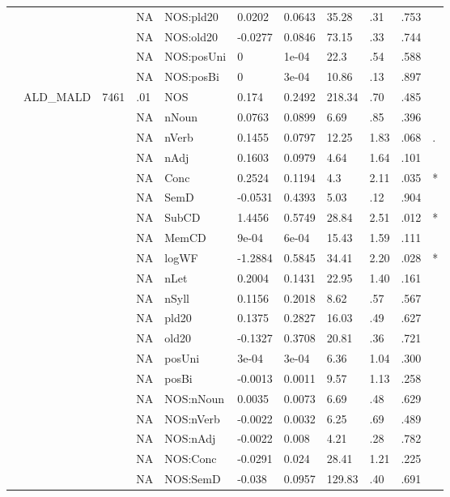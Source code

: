 \begin{table}[ht]
\begin{tabular}{lllllllllll}
   &  &  & NA & NOS:pld20 & 0.0202 & 0.0643 & 35.28 & .31 & .753 &   \\ 
   &  &  & NA & NOS:old20 & -0.0277 & 0.0846 & 73.15 & .33 & .744 &   \\ 
   &  &  & NA & NOS:posUni & 0 & 1e-04 & 22.3 & .54 & .588 &   \\ 
   &  &  & NA & NOS:posBi & 0 & 3e-04 & 10.86 & .13 & .897 &   \\ 
   & ALD\_MALD & 7461 & .01 & NOS & 0.174 & 0.2492 & 218.34 & .70 & .485 &   \\ 
   &  &  & NA & nNoun & 0.0763 & 0.0899 & 6.69 & .85 & .396 &   \\ 
   &  &  & NA & nVerb & 0.1455 & 0.0797 & 12.25 & 1.83 & .068 & . \\ 
   &  &  & NA & nAdj & 0.1603 & 0.0979 & 4.64 & 1.64 & .101 &   \\ 
   &  &  & NA & Conc & 0.2524 & 0.1194 & 4.3 & 2.11 & .035 & * \\ 
   &  &  & NA & SemD & -0.0531 & 0.4393 & 5.03 & .12 & .904 &   \\ 
   &  &  & NA & SubCD & 1.4456 & 0.5749 & 28.84 & 2.51 & .012 & * \\ 
   &  &  & NA & MemCD & 9e-04 & 6e-04 & 15.43 & 1.59 & .111 &   \\ 
   &  &  & NA & logWF & -1.2884 & 0.5845 & 34.41 & 2.20 & .028 & * \\ 
   &  &  & NA & nLet & 0.2004 & 0.1431 & 22.95 & 1.40 & .161 &   \\ 
   &  &  & NA & nSyll & 0.1156 & 0.2018 & 8.62 & .57 & .567 &   \\ 
   &  &  & NA & pld20 & 0.1375 & 0.2827 & 16.03 & .49 & .627 &   \\ 
   &  &  & NA & old20 & -0.1327 & 0.3708 & 20.81 & .36 & .721 &   \\ 
   &  &  & NA & posUni & 3e-04 & 3e-04 & 6.36 & 1.04 & .300 &   \\ 
   &  &  & NA & posBi & -0.0013 & 0.0011 & 9.57 & 1.13 & .258 &   \\ 
   &  &  & NA & NOS:nNoun & 0.0035 & 0.0073 & 6.69 & .48 & .629 &   \\ 
   &  &  & NA & NOS:nVerb & -0.0022 & 0.0032 & 6.25 & .69 & .489 &   \\ 
   &  &  & NA & NOS:nAdj & -0.0022 & 0.008 & 4.21 & .28 & .782 &   \\ 
   &  &  & NA & NOS:Conc & -0.0291 & 0.024 & 28.41 & 1.21 & .225 &   \\ 
   &  &  & NA & NOS:SemD & -0.038 & 0.0957 & 129.83 & .40 & .691 &   \\ 

\end{tabular}
\end{table}

